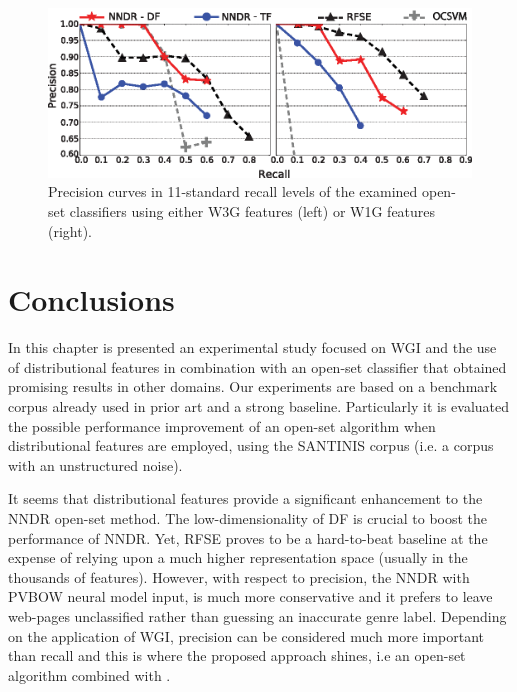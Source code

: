 {\begin{figure}[t]
\begin{center}
    \includegraphics[scale=0.95]{Figures/NNDR_W3G-W1G_Best_RFSE-OCSVM-Baselines.eps}
	\caption{Precision curves in 11-standard recall levels of the examined open-set classifiers using either W3G features (left) or W1G features (right).}
	\label{chap:word_embeddings:fig:NNDR_W3G_Best_RFSE_Baseline}
	\end{center}
\end{figure}


\section{Conclusions}\label{chap:word_embeddings:sec:conclusions}

In this chapter is presented an experimental study focused on WGI and the use of distributional features in combination with an open-set classifier that obtained promising results in other domains. Our experiments are based on a benchmark corpus already used in prior art and a strong baseline. Particularly it is evaluated the possible performance improvement of an open-set algorithm when distributional features are employed, using the SANTINIS corpus (i.e. a corpus with an unstructured noise).

It seems that distributional features provide a significant enhancement to the NNDR open-set method. The low-dimensionality of DF is crucial to boost the performance of NNDR. Yet, RFSE proves to be a hard-to-beat baseline at the expense of relying upon a much higher representation space (usually in the thousands of features). However, with respect to precision, the NNDR with PVBOW neural model input, is much more conservative and it prefers to leave web-pages unclassified rather than guessing an inaccurate genre label. Depending on the application of WGI, precision can be considered much more important than recall and this is where the proposed approach shines, i.e an open-set algorithm combined with .

}
